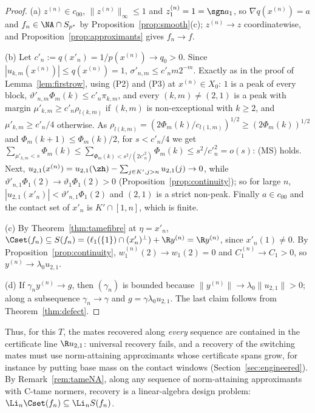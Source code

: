 \begin{proof}
(a) $z^{(n)}\in c_{00}$, $\|z^{(n)}\|_\infty\le1$ and $z^{(n)}_1=1=\sgn a_1$,
so $\nabla q(x^{(n)})=a$ and $f_n\in\NA\cap S_{p^*}$ by
Proposition~\ref{prop:smooth}(c); $z^{(n)}\to z$ coordinatewise, and
Proposition~\ref{prop:approximants} gives $f_n\to f$.

(b) Let $c'_n:=q(x'_n)=1/p(x^{(n)})\to q_0>0$.  Since $|u_{k,m}(x^{(n)})|
\le q(x^{(n)})=1$, $\sigma'_{n,m}\le c'_nm2^{-m}$.  Exactly as in the proof
of Lemma~\ref{lem:firstrow}, using (P2) and (P3) at $x^{(n)}\in X_0$: $1$ is a
peak of every block, $\vartheta'_{n,m}\Phi_m(k)\le c'_n\pi_{k,m}$, and every
$(k,m)\ne(2,1)$ is a peak with margin $\mu'_{k,m}\ge c'_n\rho_{l(k,m)}$ if
$(k,m)$ is non-exceptional with $k\ge2$, and $\mu'_{k,m}\ge c'_n/4$
otherwise.  As $\rho_{l(k,m)}=(2\Phi_m(k)/c_{l(1,m)})^{1/2}\ge(2\Phi_m(k))^{1/2}$
and $\Phi_m(k+1)\le\Phi_m(k)/2$, for $s<c'_n/4$ we get
$\sum_{\mu'_{k,m}<s}\Phi_m(k)\le\sum_{\Phi_m(k)<s^2/(2c'^2_n)}\Phi_m(k)\le
s^2/c'^2_n=o(s)$: (MS) holds.  Next,
$u_{2,1}(x^{(n)})=u_{2,1}(\zh)-\sum_{j\in K',j>n}u_{2,1}(j)\to0$, while
$\vartheta'_{n,1}\Phi_1(2)\to\vartheta_1\Phi_1(2)>0$
(Proposition~\ref{prop:continuity}); so for large $n$,
$|u_{2,1}(x'_n)|<\vartheta'_{n,1}\Phi_1(2)$ and $(2,1)$ is a strict
non-peak.  Finally $a\in c_{00}$ and the contact set of $x'_n$ is
$K'\cap[1,n]$, which is finite.

(c) By Theorem~\ref{thm:tamefibre} at $\eta=x'_n$,
$\Cset(f_n)\subseteq S(f_n)=(\ell_1(\{1\})\cap(x'_n)^\perp)+\R y^{(n)}=\R
y^{(n)}$, since $x'_n(1)\ne0$.  By Proposition~\ref{prop:continuity},
$w^{(n)}_1(2)\to w_1(2)=0$ and $C^{(n)}_1\to C_1>0$, so $y^{(n)}\to
\lambda_0u_{2,1}$.

(d) If $\gamma_ny^{(n)}\to g$, then $(\gamma_n)$ is bounded because
$\|y^{(n)}\|\to\lambda_0\|u_{2,1}\|>0$; along a subsequence $\gamma_n\to\gamma$
and $g=\gamma\lambda_0u_{2,1}$.  The last claim follows from
Theorem~\ref{thm:defect}.
\end{proof}

Thus, for this $T$, the mates recovered along \emph{every} sequence are
contained in the certificate line $\R u_{2,1}$: universal recovery fails, and
a recovery of the switching mates must use norm-attaining approximants whose
certificate spans grow, for instance by putting base mass on the contact
windows (Section~\ref{sec:engineered}).  By Remark~\ref{rem:tameNA}, along
any sequence of norm-attaining approximants with C-tame normers, recovery is
a linear-algebra design problem: $\Li_n\Cset(f_n)\subseteq\Li_nS(f_n)$.

